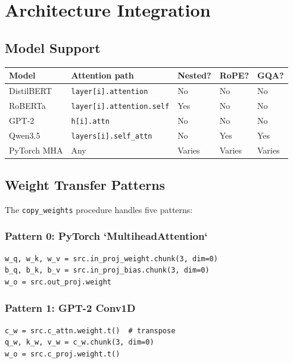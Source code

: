 \section{Architecture Integration}

\subsection{Model Support}

\begin{table}[H]
\centering
\small
\begin{tabular}{lllll}
\toprule
\textbf{Model} & \textbf{Attention path} & \textbf{Nested?} & \textbf{RoPE?} & \textbf{GQA?} \\
\midrule
DistilBERT & \texttt{layer[i].attention} & No & No & No \\
RoBERTa & \texttt{layer[i].attention.self} & Yes & No & No \\
GPT-2 & \texttt{h[i].attn} & No & No & No \\
Qwen3.5 & \texttt{layers[i].self\_attn} & No & Yes & Yes \\
PyTorch MHA & Any & Varies & Varies & Varies \\
\bottomrule
\end{tabular}
\end{table}

\subsection{Weight Transfer Patterns}

The \texttt{copy\_weights} procedure handles five patterns:

\subsubsection{Pattern 0: PyTorch `MultiheadAttention`}

\begin{lstlisting}
w_q, w_k, w_v = src.in_proj_weight.chunk(3, dim=0)
b_q, b_k, b_v = src.in_proj_bias.chunk(3, dim=0)
w_o = src.out_proj.weight
\end{lstlisting}

\subsubsection{Pattern 1: GPT-2 Conv1D}

\begin{lstlisting}
c_w = src.c_attn.weight.t()  # transpose
q_w, k_w, v_w = c_w.chunk(3, dim=0)
w_o = src.c_proj.weight.t()
\end{lstlisting}

